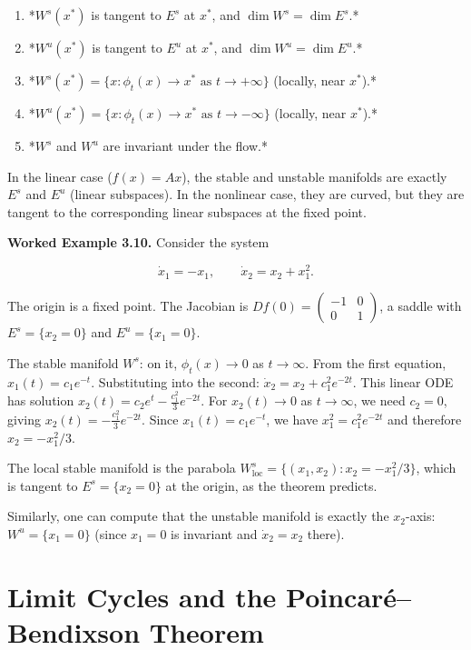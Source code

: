 \begin{enumerate}[nosep]
  \item *$W^s(x^*)$ is tangent to $E^s$ at $x^*$, and $\dim W^s = \dim E^s$.*
  \item *$W^u(x^*)$ is tangent to $E^u$ at $x^*$, and $\dim W^u = \dim E^u$.*
  \item *$W^s(x^*) = \{x : \phi_t(x) \to x^* \text{ as } t \to +\infty\}$ (locally, near $x^*$).*
  \item *$W^u(x^*) = \{x : \phi_t(x) \to x^* \text{ as } t \to -\infty\}$ (locally, near $x^*$).*
  \item *$W^s$ and $W^u$ are invariant under the flow.*
\end{enumerate}

In the linear case ($f(x) = Ax$), the stable and unstable manifolds are exactly $E^s$ and $E^u$ (linear subspaces). In the nonlinear case, they are curved, but they are tangent to the corresponding linear subspaces at the fixed point.

\textbf{Worked Example 3.10.} Consider the system

\[
\dot{x}_1 = -x_1, \qquad \dot{x}_2 = x_2 + x_1^2.
\]

The origin is a fixed point. The Jacobian is $Df(0) = \begin{pmatrix} -1 & 0 \\ 0 & 1 \end{pmatrix}$, a saddle with $E^s = \{x_2 = 0\}$ and $E^u = \{x_1 = 0\}$.

The stable manifold $W^s$: on it, $\phi_t(x) \to 0$ as $t \to \infty$. From the first equation, $x_1(t) = c_1 e^{-t}$. Substituting into the second: $\dot{x}_2 = x_2 + c_1^2 e^{-2t}$. This linear ODE has solution $x_2(t) = c_2 e^t - \frac{c_1^2}{3}e^{-2t}$. For $x_2(t) \to 0$ as $t \to \infty$, we need $c_2 = 0$, giving $x_2(t) = -\frac{c_1^2}{3}e^{-2t}$. Since $x_1(t) = c_1 e^{-t}$, we have $x_1^2 = c_1^2 e^{-2t}$ and therefore $x_2 = -x_1^2/3$.

The local stable manifold is the parabola $W^s_{\text{loc}} = \{(x_1, x_2) : x_2 = -x_1^2/3\}$, which is tangent to $E^s = \{x_2 = 0\}$ at the origin, as the theorem predicts.

Similarly, one can compute that the unstable manifold is exactly the $x_2$-axis: $W^u = \{x_1 = 0\}$ (since $x_1 = 0$ is invariant and $\dot{x}_2 = x_2$ there).


\bigskip


\section{Limit Cycles and the Poincar\'e--Bendixson Theorem}\label{sec:3.6}

